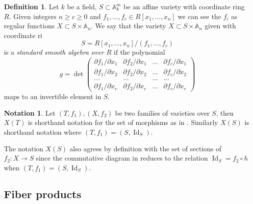 \documentclass[a4paper,12pt,reqno]{amsart}
\newcommand{\field}[1]{\mathbb{#1}}  %
\newcommand{\A}{\field{A}}
\DeclareMathOperator{\id}{Id}
\theoremstyle{definition}
\newtheorem{definition}[lemma]{Definition}
\newtheorem{notation}[lemma]{Notation}
\numberwithin{lemma}{section}
\numberwithin{equation}{section}
\numberwithin{figure}{section}
\begin{document}
\begin{definition}
	\label{definition-standard-smooth}
	Let $k$ be a field, $S \subset \A^m_k$ be an affine variety with coordinate ring $R$. Given integers $n \geq c \geq 0$ and
	$f_1, \ldots, f_c \in R[x_1, \ldots, x_n]$ we can see the $f_i$ as regular functions $X \subset S \times \A_n$. We say that the variety $X \subset S \times \A_n$ given with coordinate ri
	$$
	S = R[x_1, \ldots, x_n]/(f_1, \ldots, f_c)
	$$
	is a {\it standard smooth algebra over $R$} if the polynomial
	$$
	g =
	\det
	\left(
	\begin{matrix}
	\partial f_1/\partial x_1 &
	\partial f_2/\partial x_1 &
	\ldots &
	\partial f_c/\partial x_1 \\
	\partial f_1/\partial x_2 &
	\partial f_2/\partial x_2 &
	\ldots &
	\partial f_c/\partial x_2 \\
	\ldots & \ldots & \ldots & \ldots \\
	\partial f_1/\partial x_c &
	\partial f_2/\partial x_c &
	\ldots &
	\partial f_c/\partial x_c
	\end{matrix}
	\right)
	$$
	maps to an invertible element in $S$.
\end{definition}


\begin{notation}
	Let $(T,f_1), (X,f_2)$ be two families of varieties over $S$, then $X(T)$ is shorthand notation for the set of morphisms as in . Similarly $X(S)$ is shorthand notation where $(T,f_1) = (S, \id_S)$. 
\end{notation}
The notation $X(S)$ also agrees by definition with the set of sections of $f_2 : X \to S$ since the commutative diagram in  reduces to the relation $\id_S = f_2 \circ h$ when $(T,f_1) = (S, \id_S)$.

\subsection{Fiber products}
\end{document}
